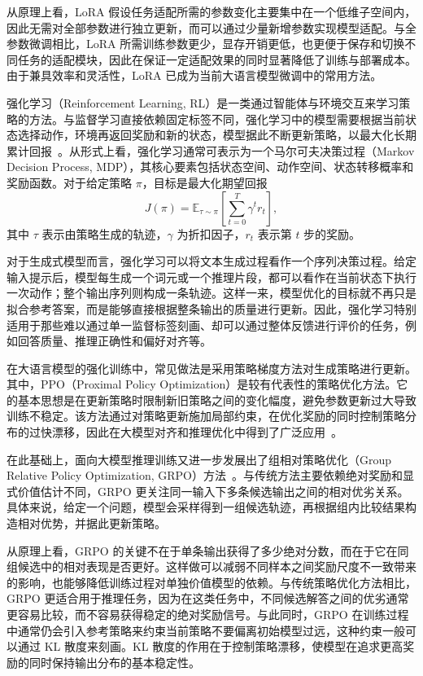 从原理上看，LoRA 假设任务适配所需的参数变化主要集中在一个低维子空间内，因此无需对全部参数进行独立更新，而可以通过少量新增参数实现模型适配。与全参数微调相比，LoRA 所需训练参数更少，显存开销更低，也更便于保存和切换不同任务的适配模块，因此在保证一定适配效果的同时显著降低了训练与部署成本。由于兼具效率和灵活性，LoRA 已成为当前大语言模型微调中的常用方法。


强化学习（Reinforcement Learning, RL）是一类通过智能体与环境交互来学习策略的方法。与监督学习直接依赖固定标签不同，强化学习中的模型需要根据当前状态选择动作，环境再返回奖励和新的状态，模型据此不断更新策略，以最大化长期累计回报~\cite{sutton1998reinforcement}。从形式上看，强化学习通常可表示为一个马尔可夫决策过程（Markov Decision Process, MDP），其核心要素包括状态空间、动作空间、状态转移概率和奖励函数。对于给定策略 $\pi$，目标是最大化期望回报
\begin{equation}
    J(\pi)=\mathbb{E}_{\tau \sim \pi}\left[\sum_{t=0}^{T}\gamma^t r_t\right],
\end{equation}
其中 $\tau$ 表示由策略生成的轨迹，$\gamma$ 为折扣因子，$r_t$ 表示第 $t$ 步的奖励。

对于生成式模型而言，强化学习可以将文本生成过程看作一个序列决策过程。给定输入提示后，模型每生成一个词元或一个推理片段，都可以看作在当前状态下执行一次动作；整个输出序列则构成一条轨迹。这样一来，模型优化的目标就不再只是拟合参考答案，而是能够直接根据整条输出的质量进行更新。因此，强化学习特别适用于那些难以通过单一监督标签刻画、却可以通过整体反馈进行评价的任务，例如回答质量、推理正确性和偏好对齐等。

在大语言模型的强化训练中，常见做法是采用策略梯度方法对生成策略进行更新。其中，PPO（Proximal Policy Optimization）是较有代表性的策略优化方法。它的基本思想是在更新策略时限制新旧策略之间的变化幅度，避免参数更新过大导致训练不稳定。该方法通过对策略更新施加局部约束，在优化奖励的同时控制策略分布的过快漂移，因此在大模型对齐和推理优化中得到了广泛应用~\cite{schulman2017ppo,ouyang2022training}。

在此基础上，面向大模型推理训练又进一步发展出了组相对策略优化（Group Relative Policy Optimization, GRPO）方法~\cite{guo2025deepseekr1}。与传统方法主要依赖绝对奖励和显式价值估计不同，GRPO 更关注同一输入下多条候选输出之间的相对优劣关系。具体来说，给定一个问题，模型会采样得到一组候选轨迹，再根据组内比较结果构造相对优势，并据此更新策略。

从原理上看，GRPO 的关键不在于单条输出获得了多少绝对分数，而在于它在同组候选中的相对表现是否更好。这样做可以减弱不同样本之间奖励尺度不一致带来的影响，也能够降低训练过程对单独价值模型的依赖。与传统策略优化方法相比，GRPO 更适合用于推理任务，因为在这类任务中，不同候选解答之间的优劣通常更容易比较，而不容易获得稳定的绝对奖励信号。与此同时，GRPO 在训练过程中通常仍会引入参考策略来约束当前策略不要偏离初始模型过远，这种约束一般可以通过 KL 散度来刻画。KL 散度的作用在于控制策略漂移，使模型在追求更高奖励的同时保持输出分布的基本稳定性。

